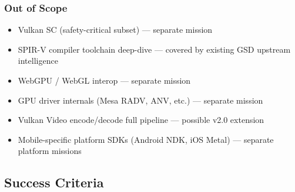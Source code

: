 \documentclass[11pt,letterpaper]{article}
\begin{document}
\subsubsection{Out of Scope}
\begin{itemize}[noitemsep]
  \item Vulkan SC (safety-critical subset) --- separate mission
  \item SPIR-V compiler toolchain deep-dive --- covered by existing GSD upstream intelligence
  \item WebGPU / WebGL interop --- separate mission
  \item GPU driver internals (Mesa RADV, ANV, etc.) --- separate mission
  \item Vulkan Video encode/decode full pipeline --- possible v2.0 extension
  \item Mobile-specific platform SDKs (Android NDK, iOS Metal) --- separate platform missions
\end{itemize}

\subsection{Success Criteria}
\end{document}
